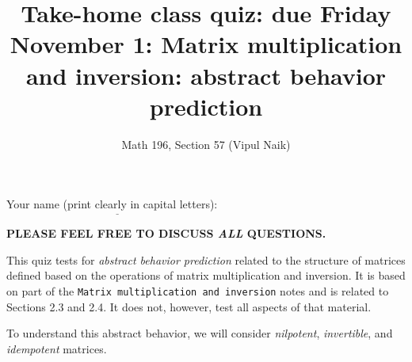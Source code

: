 \documentclass[10pt]{amsart}
\title{Take-home class quiz: due Friday November 1: Matrix multiplication and inversion: abstract behavior prediction}
\author{Math 196, Section 57 (Vipul Naik)}
\begin{document}
\maketitle

Your name (print clearly in capital letters): $\underline{\qquad\qquad\qquad\qquad\qquad\qquad\qquad\qquad\qquad\qquad}$

{\bf PLEASE FEEL FREE TO DISCUSS {\em ALL} QUESTIONS.}

This quiz tests for {\em abstract behavior prediction} related to the
structure of matrices defined based on the operations of matrix
multiplication and inversion. It is based on part of the {\tt Matrix
  multiplication and inversion} notes and is related to Sections 2.3
and 2.4. It does not, however, test all aspects of that material.

To understand this abstract behavior, we will consider {\em
  nilpotent}, {\em invertible}, and {\em idempotent} matrices.
\end{document}

